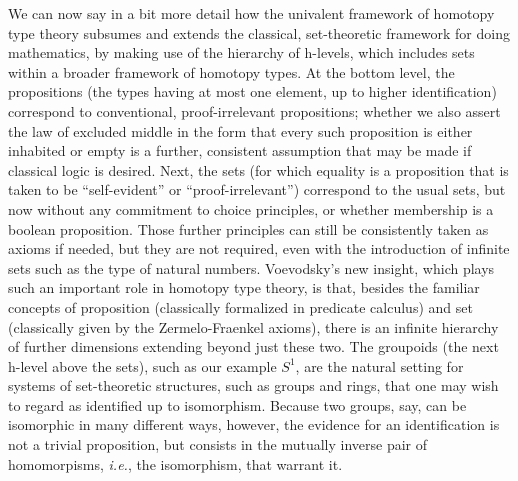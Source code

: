 \documentclass[11pt]{article}
\theoremstyle{remark}
\theoremstyle{definition}
\begin{document}
We can now say in a bit more detail how the univalent framework of homotopy type theory subsumes and extends the classical, set-theoretic
framework for doing mathematics, by making use of the hierarchy of h-levels, which includes sets within a broader
framework of homotopy types.  At the bottom level, the propositions (the types having at most one element, up to higher
identification) correspond to conventional, proof-irrelevant propositions; whether we also assert the law of excluded middle in the form that every such proposition is either inhabited or empty is a further, consistent assumption that may be made if classical logic is desired.  Next, the
sets (for which equality is a proposition that is taken to be ``self-evident'' or ``proof-irrelevant'')
correspond to the usual sets, but now without any commitment to choice principles, or whether membership is a boolean
proposition.  Those further principles can still be consistently taken as axioms if needed, but they are not required, even with the introduction of infinite sets such as the type of natural numbers. Voevodsky's new insight, which plays such an important role in homotopy type theory, is that, besides the familiar concepts of proposition (classically formalized in predicate
calculus) and set (classically given by the Zermelo-Fraenkel axioms), there is an infinite hierarchy of further
dimensions extending beyond just these two.  The groupoids (the next h-level above the sets), such as our example $S^1$, are the natural setting for systems of set-theoretic structures, such as groups and rings, that one may wish to regard as identified up to
isomorphism.  Because two groups, say, can be isomorphic in many different ways, however, the evidence for an
identification is not a trivial proposition, but consists in the mutually inverse pair of homomorpisms, \textit{i.e.}, the
isomorphism, that warrant it.
\end{document}
